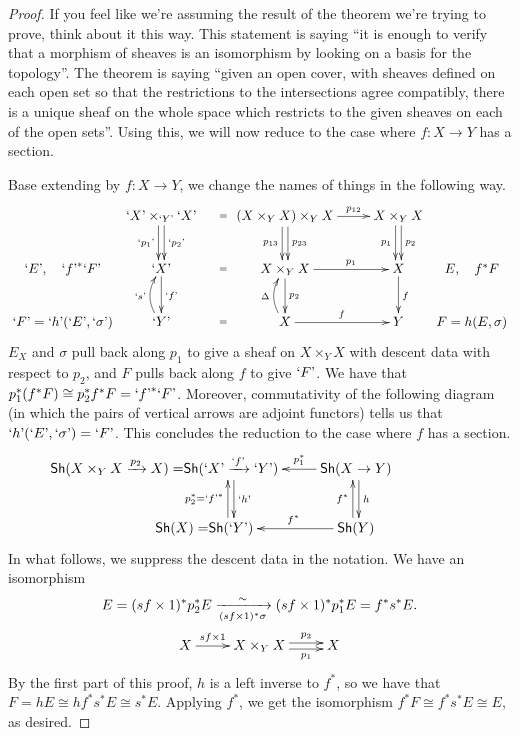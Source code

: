 \begin{proof}
{   If you feel like we're assuming the result of the theorem we're trying to prove, think
   about it this way. This statement is saying ``it is enough to verify that a morphism
   of sheaves is an isomorphism by looking on a basis for the topology''. The theorem
   is saying ``given an open cover, with sheaves defined on each open set so that the
   restrictions to the intersections agree compatibly, there is a unique sheaf on the
   whole space which restricts to the given sheaves on each of the open sets''.} Using
   this, we will now reduce to the case where $f:X\to Y$ has a section.

   Base extending by $f:X\to Y$, we change the names of things in the following way.
   \def\n{\text{'}}
   \[
    \xymatrix{
    & `X\n\times_{`Y\n} `X\n \ar@<.5ex>[d]^{`p_2\n}\ar@<-.5ex>[d]_{`p_1\n} \ar@{}[r]|{=}
    &(X\times_Y X)\times_Y X \ar@<.5ex>[d]^{p_{23}}
            \ar@<-.5ex>[d]_{p_{13}} \ar[r]^<>(.5){p_{12}}
    & X\times_Y X \ar@<.5ex>[d]^{p_2}\ar@<-.5ex>[d]_{p_1}\\
    `E\n,\quad `f\n^* `F\n \hspace{-2em}
    & `X\n \ar[d]^{`f\n}\ar@{}[r]|{=}
    & X\times_Y X \ar[r]^<>(.5){p_1} \ar[d]^{p_2} & X \ar[d]^f & \hspace{-2em} E,\quad f^*F\\
    `F\n = `h\n(`E\n,`\sigma\n) \hspace{-2em}
    & `Y\n \ar@/^2ex/[u]^{`s\n}\ar@{}[r]|{=}
    & X\ar[r]^f \ar@/^2ex/[u]^{\Delta} & Y & \hspace{-2em} F=h(E,\sigma)
    }
   \]
    $E_X$ and $\sigma$ pull back along $p_1$ to give a sheaf on $X\times_Y X$ with
   descent data with respect to $p_2$, and $F$ pulls back along $f$ to give $`F\n$. We
   have that $p_1^* (f^* F)\cong p_2^*f^* F = `f\n^*`F\n$. Moreover, commutativity of the
   following diagram (in which the pairs of vertical arrows are adjoint functors) tells
   us that $`h\n(`E\n,`\sigma\n)=`F\n$. This concludes the reduction to the case where
   $f$ has a section.
   \[\qquad\qquad\xymatrix{
    \llap{$\sh(X\times_Y X \xrightarrow{p_2} X)=$}\sh(`X\n\xrightarrow{`f\n}`Y\n) \ar@<.5ex>[d]^{`h\n}
    & \sh(X\to Y)\ar[l]_<>(.5){p_1^*} \ar@<.5ex>[d]^{h} \\
    \llap{$\sh(X)=$}\sh(`Y\n) \ar@<.5ex>[u]^{p_2^*=`f\n^*} & \sh(Y) \ar[l]_{f^*}\ar@<.5ex>[u]^{f^*}
   }\]
    In what follows, we suppress the descent data in the notation. We have an isomorphism
   \begin{gather*}
     E=(sf\times 1)^* p_2^* E \xrightarrow[(sf\times 1)^*\sigma]{\sim}
     (sf\times 1)^*p_1^*E =f^*s^*E.\\
   \xymatrix{
    X \ar[r]^<>(.5){sf\times 1}
    & X\times_Y X \ar@<.5ex>[r]^<>(.5){p_2} \ar@<-.5ex>[r]_<>(.5){p_1} & X
   }
   \end{gather*}
   By the first part of this proof, $h$ is a left inverse to $f^*$, so we have that $F =
   hE \cong hf^*s^*E\cong s^*E$. Applying $f^*$, we get the isomorphism $f^*F\cong f^*s^*
   E\cong E$, as desired.
 \end{proof}

